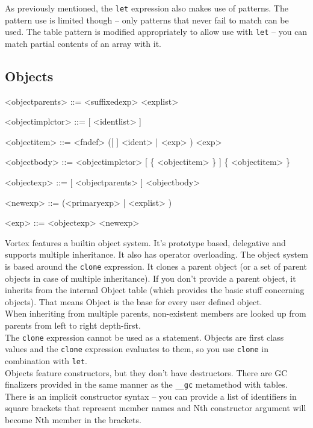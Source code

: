 \documentclass{article}
\newenvironment{bnf}
{
\begin{mdframed}
\begin{grammar}
}
{
\end{grammar}
\end{mdframed}
}
\begin{document}
As previously mentioned, the \verb|let| expression also makes use of patterns.
The pattern use is limited though -- only patterns that never fail to match
can be used. The table pattern is modified appropriately to allow use with
\verb|let| -- you can match partial contents of an array with it.
\subsection{Objects}
\begin{bnf}
<objectparents> ::= <suffixedexp>
    \alt \lit{(} <explist> \lit{)}

<objectimplctor> ::= \lit{[} [ <identlist> ] \lit{]}

<objectitem> ::= <fndef>
    \alt ([ \lit{\$} ] <ident> | \lit{\$(} <exp> \lit{)}) \lit{:} <exp>

<objectbody> ::= <objectimplctor> [  \{ <objectitem> \}  ]
    \alt {} \{ <objectitem> \} 

<objectexp> ::=  [ <objectparents> ] <objectbody>

<newexp> ::=  (<primaryexp> | \lit{(} <explist> \lit{)})

<exp> ::= <objectexp>
    \alt <newexp>
\end{bnf}
Vortex features a builtin object system. It's prototype based, delegative
and supports multiple inheritance. It also has operator overloading. The object
system is based around the \verb|clone| expression. It clones a parent object
(or a set of parent objects in case of multiple inheritance). If you don't
provide a parent object, it inherits from the internal Object table (which
provides the basic stuff concerning objects). That means Object is the base
for every user defined object.\\
When inheriting from multiple parents, non-existent members are looked up
from parents from left to right depth-first.\\
The \verb|clone| expression cannot be used as a statement. Objects are first
class values and the \verb|clone| expression evaluates to them, so you use
\verb|clone| in combination with \verb|let|.\\
Objects feature constructors, but they don't have destructors. There are GC
finalizers provided in the same manner as the \verb|__gc| metamethod with
tables. There is an implicit constructor syntax -- you can provide a list
of identifiers in square brackets that represent member names and Nth
constructor argument will become Nth member in the brackets.\\
\end{document}

